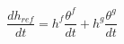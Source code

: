 \begin{equation}
\frac{dh_{ref}}{dt} = h^f \frac{\theta^f }{dt} + h^g \frac{\theta^g }{dt}
\end{equation}